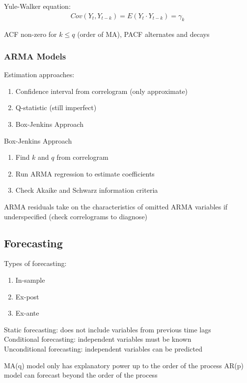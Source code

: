 \documentclass[12pt]{article}
\numberwithin{equation}{section}
\begin{document}
Yule-Walker equation:
\begin{gather}
    Cov(Y_t,Y_{t-k}) = E(Y_t \cdot Y_{t-k}) = \gamma_k
\end{gather}

ACF non-zero for $k \leq q$ (order of MA), PACF alternates and decays

\subsubsection{ARMA Models}

Estimation approaches:
\begin{enumerate}
    \item Confidence interval from correlogram (only approximate)
    \item Q-statistic (still imperfect)
    \item Box-Jenkins Approach
\end{enumerate}

Box-Jenkins Approach
\begin{enumerate}
    \item Find $k$ and $q$ from correlogram
    \item Run ARMA regression to estimate coefficients
    \item Check Akaike and Schwarz information criteria
\end{enumerate}

ARMA residuals take on the characteristics of omitted ARMA variables if underspecified (check correlograms to diagnose)

\subsection{Forecasting}

Types of forecasting:
\begin{enumerate}
    \item In-sample
    \item Ex-post
    \item Ex-ante
\end{enumerate}

Static forecasting: does not include variables from previous time lags \\
Conditional forecasting: independent variables must be known \\
Unconditional forecasting: independent variables can be predicted

MA(q) model only has explanatory power up to the order of the process
AR(p) model can forecast beyond the order of the process
\end{document}

